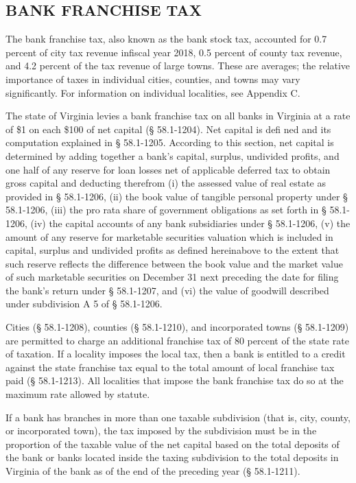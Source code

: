 \documentclass[
]{book}
\begin{document}
\hypertarget{bank-franchise-tax}{%
\subsection{BANK FRANCHISE TAX}\label{bank-franchise-tax}}

The bank franchise tax, also known as the bank stock tax, accounted for 0.7 percent of city tax revenue infiscal year 2018, 0.5 percent of county tax revenue, and 4.2 percent of the tax revenue of large towns. These are averages; the relative importance of taxes in individual cities, counties, and towns may vary significantly. For information on individual localities, see Appendix C.

The state of Virginia levies a bank franchise tax on all banks in Virginia at a rate of \$1 on each \$100 of net capital (§ 58.1-1204). Net capital is defi ned and its computation explained in § 58.1-1205. According to this section, net capital is determined by adding together a bank's capital, surplus, undivided profits, and one half of any reserve for loan losses net of applicable deferred tax to obtain gross capital and deducting therefrom (i) the assessed value of real estate as provided in § 58.1-1206, (ii) the book value of tangible personal property under § 58.1-1206, (iii) the pro rata share of government obligations as set forth in § 58.1-1206, (iv) the capital accounts of any bank subsidiaries under § 58.1-1206, (v) the amount of any reserve for marketable securities valuation which is included in capital, surplus and undivided profits as defined hereinabove to the extent that such reserve reflects the difference between the book value and the market value of such marketable securities on December 31 next preceding the date for filing the bank's return under § 58.1-1207, and (vi) the value of goodwill described under subdivision A 5 of § 58.1-1206.

Cities (§ 58.1-1208), counties (§ 58.1-1210), and incorporated towns (§ 58.1-1209) are permitted to charge an additional franchise tax of 80 percent of the state rate of taxation. If a locality imposes the local tax, then a bank is entitled to a credit against the state franchise tax equal to the total amount of local franchise tax paid (§ 58.1-1213). All localities that impose the bank franchise tax do so at the maximum rate allowed by statute.

If a bank has branches in more than one taxable subdivision (that is, city, county, or incorporated town), the tax imposed by the subdivision must be in the proportion of the taxable value of the net capital based on the total deposits of the bank or banks located inside the taxing subdivision to the total deposits in Virginia of the bank as of the end of the preceding year (§ 58.1-1211).
\end{document}
